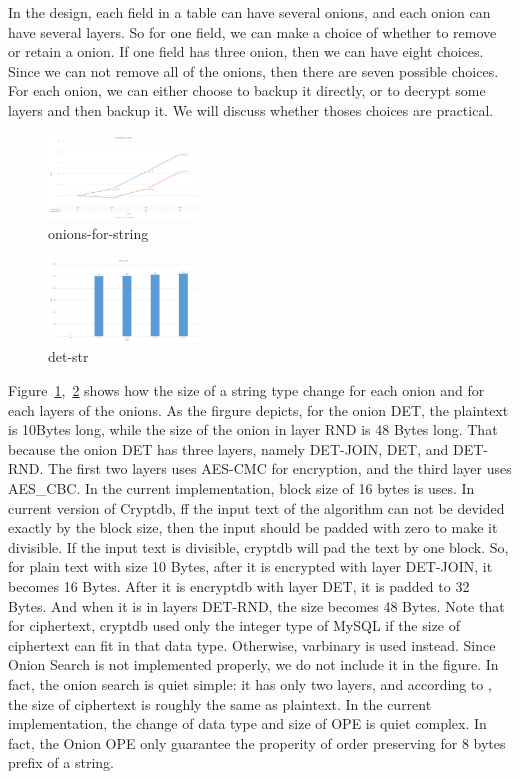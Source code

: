 In the design, each field in a table can have several onions, and each onion can have several layers. So for one field, we can make a choice of whether to remove or retain a onion. If one field has three onion, then we can have eight choices. Since we can not remove all of the onions, then there are seven possible choices. For each onion, we can either choose to backup it directly, or to decrypt some layers and then backup it. We will discuss whether thoses choices are practical.

\begin{figure}[tb]
\centering
\includegraphics[width=4cm]{images/onions-for-string.png}
\caption{onions-for-string}
\label{fig:stack4}
\end{figure}


\begin{figure}[tb]
\centering
\includegraphics[width=4cm]{images/det-str.png}
\caption{det-str}
\label{fig:stack5}
\end{figure}



Figure~\ref{fig:stack4},~\ref{fig:stack5} shows how the size of a string type change for each onion and for each layers of the onions. As the firgure depicts, for the onion DET, the plaintext is 10Bytes long, while the size of the onion in layer RND is 48 Bytes long. That because the onion DET has three layers, namely DET-JOIN, DET, and DET-RND. The first two layers uses AES-CMC for encryption, and the third layer uses AES\_CBC. In the current implementation, block size of 16 bytes is uses. In current version of Cryptdb,  ff the input text of the algorithm can not be devided exactly by the block size, then the input should be padded with zero to make it divisible. If the input text is divisible, cryptdb will pad the text by one block. So, for plain text with size 10 Bytes, after it is encrypted with layer DET-JOIN, it becomes 16 Bytes. After it is encryptdb with layer DET, it is padded to 32 Bytes. And when it is in layers DET-RND, the size becomes 48 Bytes. Note that for ciphertext, cryptdb used only the integer type of MySQL if the size of ciphertext can fit in that data type. Otherwise, varbinary is used instead. Since Onion Search is not implemented properly, we do not include it in the figure. In fact, the onion search is quiet simple: it has only two layers, and according to \citep{song2000practical}, the size of ciphertext is roughly the same as plaintext. In the current implementation, the change of data type and size of OPE is quiet complex. In fact, the Onion OPE only guarantee the properity of order preserving for 8 bytes prefix of a string.




